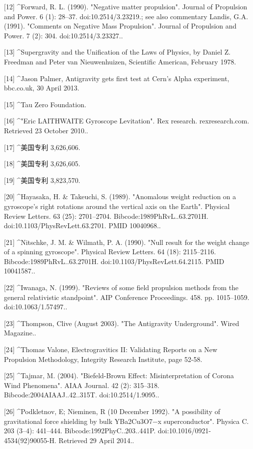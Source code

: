 [12]
^Forward, R. L. (1990). "Negative matter propulsion". Journal of Propulsion and Power. 6 (1): 28–37. doi:10.2514/3.23219.; see also commentary Landis, G.A. (1991). "Comments on Negative Mass Propulsion". Journal of Propulsion and Power. 7 (2): 304. doi:10.2514/3.23327..

[13]
^Supergravity and the Unification of the Laws of Physics, by Daniel Z. Freedman and Peter van Nieuwenhuizen, Scientific American, February 1978.

[14]
^Jason Palmer, Antigravity gets first test at Cern's Alpha experiment, bbc.co.uk, 30 April 2013.

[15]
^Tau Zero Foundation.

[16]
^"Eric LAITHWAITE Gyroscope Levitation". Rex research. rexresearch.com. Retrieved 23 October 2010..

[17]
^美国专利 3,626,606.

[18]
^美国专利 3,626,605.

[19]
^美国专利 3,823,570.

[20]
^Hayasaka, H. & Takeuchi, S. (1989). "Anomalous weight reduction on a gyroscope's right rotations around the vertical axis on the Earth". Physical Review Letters. 63 (25): 2701–2704. Bibcode:1989PhRvL..63.2701H. doi:10.1103/PhysRevLett.63.2701. PMID 10040968..

[21]
^Nitschke, J. M. & Wilmath, P. A. (1990). "Null result for the weight change of a spinning gyroscope". Physical Review Letters. 64 (18): 2115–2116. Bibcode:1989PhRvL..63.2701H. doi:10.1103/PhysRevLett.64.2115. PMID 10041587..

[22]
^Iwanaga, N. (1999). "Reviews of some field propulsion methods from the general relativistic standpoint". AIP Conference Proceedings. 458. pp. 1015–1059. doi:10.1063/1.57497..

[23]
^Thompson, Clive (August 2003). "The Antigravity Underground". Wired Magazine..

[24]
^Thomas Valone, Electrogravitics II: Validating Reports on a New Propulsion Methodology, Integrity Research Institute, page 52-58.

[25]
^Tajmar, M. (2004). "Biefeld-Brown Effect: Misinterpretation of Corona Wind Phenomena". AIAA Journal. 42 (2): 315–318. Bibcode:2004AIAAJ..42..315T. doi:10.2514/1.9095..

[26]
^Podkletnov, E; Nieminen, R (10 December 1992). "A possibility of gravitational force shielding by bulk YBa2Cu3O7−x superconductor". Physica C. 203 (3–4): 441–444. Bibcode:1992PhyC..203..441P. doi:10.1016/0921-4534(92)90055-H. Retrieved 29 April 2014..

